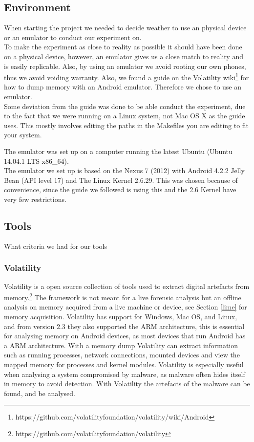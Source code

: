 \subsection{Environment}
When starting the project we needed to decide weather to use an physical device or an emulator
to conduct our experiment on.\\
To make the experiment as close to reality as possible it should have been done on a physical device, 
however, an emulator gives us a close match to reality and is easily replicable. Also, by using an emulator 
we avoid rooting our own phones, thus we avoid voiding warranty. Also, we found a guide on the Volatility 
wiki\footnote{https://github.com/volatilityfoundation/volatility/wiki/Android} for how to dump memory with 
an Android emulator. Therefore we chose to use an emulator.\\
Some deviation from the guide was done to be able conduct the experiment, due to the fact that we were running on 
a Linux system, not Mac OS X as the guide uses. This mostly involves editing the paths in the Makefiles you are editing 
to fit your system. %

The emulator was set up on a computer running the latest Ubuntu (Ubuntu 14.04.1 LTS x86\_64).\\
The emulator we set up is based on the Nexus 7 (2012) with Android 4.2.2 Jelly Bean (API level 17) and The Linux Kernel 2.6.29. 
This was chosen because of convenience, since the guide we followed is using this and the 2.6 Kernel have very few restrictions.
\subsection{Tools}
What criteria we had for our tools
  \subsubsection{Volatility}
Volatility is a open source collection of tools used to extract digital
artefacts from memory.\footnote{https://github.com/volatilityfoundation/volatility} 
The framework is not meant for a live forensic analysis but an offline analysis
on memory acquired from a live machine or device, see Section \ref{lime} for
memory acquisition. Volatility has support for Windows, Mac OS, and Linux, and
from version 2.3 they also supported the ARM architecture, this is essential
for analysing memory on Android devices, as most devices that run Android has a
ARM architecture. With a memory dump Volatility can extract information such as
running processes, network connections, mounted devices and view the mapped
memory for processes and kernel modules. Volatility is especially useful when
analysing a system compromised by malware, as malware often hides itself in
memory to avoid detection. With Volatility the artefacts of the malware can be
found, and be analysed. \\

